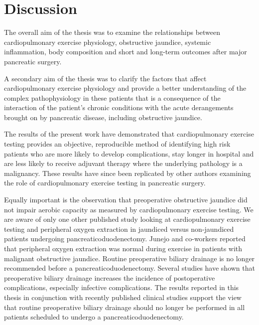 
\chapter{Discussion}
\label{ch_discussion}


\clearpage

The overall aim of the thesis was to examine the relationships between cardiopulmonary exercise physiology, obstructive jaundice, systemic inflammation, body composition and short and long-term outcomes after major pancreatic surgery. 

A secondary aim of the thesis was to clarify the factors that affect cardiopulmonary exercise physiology and provide a better understanding of the complex pathophysiology in these patients that is a consequence of the interaction of the patient's chronic conditions with the acute derangements brought on by pancreatic disease, including obstructive jaundice.

The results of the present work have demonstrated that cardiopulmonary exercise testing provides an objective, reproducible method of identifying high risk patients who are more likely to develop complications, stay longer in hospital and are less likely to receive adjuvant therapy where the underlying pathology is a malignancy. These results have since been replicated by other authors examining the role of cardiopulmonary exercise testing in pancreatic surgery. \parencite{ausania_effects_2012, ausania_double_2012, junejo_cardiopulmonary_2014}

Equally important is the observation that preoperative obstructive jaundice did not impair aerobic capacity as measured by cardiopulmonary exercise testing. We are aware of only one other published study looking at cardiopulmonary exercise testing and peripheral oxygen extraction in jaundiced versus non-jaundiced patients undergoing pancreaticoduodenectomy. Junejo and co-workers reported that peripheral oxygen extraction was normal during exercise in patients with malignant obstructive jaundice.\parencite{junejo_peripheral_2014} 
Routine preoperative biliary drainage is no longer recommended before a pancreaticoduodenectomy. Several studies have shown that preoperative biliary drainage increases the incidence of postoperative complications, especially infective complications. \parencite{van_der_gaag_preoperative_2010, arkadopoulos_preoperative_2014, fujii_preoperative_2015, furukawa_negative_2015}
The results reported in this thesis in conjunction with recently published clinical studies support the view that routine preoperative biliary drainage should no longer be performed in all patients scheduled to undergo a pancreaticoduodenectomy.

